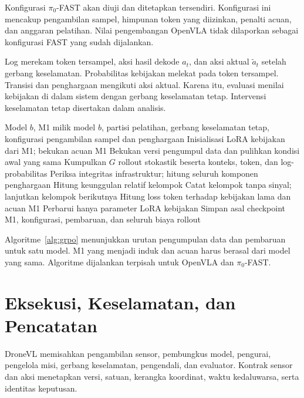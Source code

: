 Konfigurasi $\pi_0$-FAST akan diuji dan ditetapkan tersendiri. Konfigurasi ini mencakup pengambilan sampel, himpunan token yang diizinkan, penalti acuan, dan anggaran pelatihan. Nilai pengembangan OpenVLA tidak dilaporkan sebagai konfigurasi FAST yang sudah dijalankan.

Log merekam token tersampel, aksi hasil dekode $a_t$, dan aksi aktual $\tilde a_t$ setelah gerbang keselamatan. Probabilitas kebijakan melekat pada token tersampel. Transisi dan penghargaan mengikuti aksi aktual. Karena itu, evaluasi menilai kebijakan di dalam sistem dengan gerbang keselamatan tetap. Intervensi keselamatan tetap disertakan dalam analisis.

\begin{algorithm}[htbp]
\caption{Rancangan pembaruan GRPO dari M1}
\label{alg:grpo}
\small
\begin{algorithmic}[1]
\Require Model $b$, M1 milik model $b$, partisi pelatihan, gerbang keselamatan tetap, konfigurasi pengambilan sampel dan penghargaan
\State Inisialisasi LoRA kebijakan dari M1; bekukan acuan M1
    \State Bekukan versi pengumpul data dan pulihkan kondisi awal yang sama
    \State Kumpulkan $G$ rollout stokastik beserta konteks, token, dan log-probabilitas
    \State Periksa integritas infrastruktur; hitung seluruh komponen penghargaan
    \State Hitung keunggulan relatif kelompok
        \State Catat kelompok tanpa sinyal; lanjutkan kelompok berikutnya
    \Else
        \State Hitung loss token terhadap kebijakan lama dan acuan M1
        \State Perbarui hanya parameter LoRA kebijakan
    \EndIf
\EndFor
\State Simpan asal checkpoint M1, konfigurasi, pembaruan, dan seluruh biaya rollout
\end{algorithmic}
\end{algorithm}
Algoritme~\ref{alg:grpo} menunjukkan urutan pengumpulan data dan pembaruan untuk satu model. M1 yang menjadi induk dan acuan harus berasal dari model yang sama. Algoritme dijalankan terpisah untuk OpenVLA dan $\pi_0$-FAST.

\section{Eksekusi, Keselamatan, dan Pencatatan}
\label{sec:rancangan_dronevl}
DroneVL memisahkan pengambilan sensor, pembungkus model, pengurai, pengelola misi, gerbang keselamatan, pengendali, dan evaluator. Kontrak sensor dan aksi menetapkan versi, satuan, kerangka koordinat, waktu kedaluwarsa, serta identitas keputusan.

